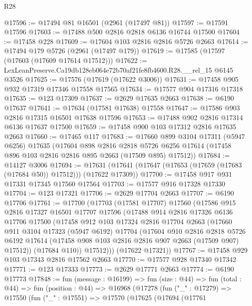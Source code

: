 \begin{lexlean}{R28}
\begin{coremodule}
@17596 := @17494 @81 @16501 (@2961 (@17497 @81))
@17597 := @17591 @17596
@17603 := @17488 @500 @2816 @2818 @6136 @16744 @17500
@17604 := @17458 @228
@17609 := @17604 @103 @2816 @2816 @5726 @2663
@17614 := @17494 @179 @5726 (@2961 (@17497 @179))
@17619 := @17585 (@17597 (@17603 (@17609 @17614 @17512)))
@17622 := LexLeanPreserve.Ca19db128eb064e72b70af21fe8fb4600.R28.__rel_15 @6145 @3526
@17625 := @17576 (@17619 (@17622 @3006))
@17631 := @17458 @905 @932 @17319 @17346 @17558 @17565
@17634 := @17577 @904 @17316 @17318
@17635 := @123 @17309
@17637 := @2629 @17635 @2663
@17638 := @6190 @17637
@17641 := @17634 (@17581 @17638) @17558
@17647 := @17586 @903 @2816 @17315 @16501 @17638 @17596
@17653 := @17488 @902 @2816 @17314 @6136 @17637 @17500
@17659 := @17458 @900 @103 @17312 @2816 @17635 @2663
@17660 := @17465 @117
@17683 := @17660
    @899
    @3104
    @17311
    (@5947 @6256)
    @17635
    (@17604
      @898
      @2816
      @2818
      @5726
      @6256
      @17614
      (@17458 @896 @103 @2816 @2816 @895 @2663 (@17509 @895) @17512))
@17684 := @14127 @3006
@17694 := @17631 (@17641 (@17647 (@17653 (@17659 (@17683 (@17684 @50)) @17512))) (@17622 @17309))
@17700 := @17458 @917 @931 @17331 @17345 @17560 @17564
@17703 := @17577 @916 @17328 @17330
@17704 := @123 @17321
@17706 := @2629 @17704 @2663
@17707 := @6190 @17706
@17761 := @17700
    (@17703
      (@17581 @17707)
      @17560
      (@17586
        @915
        @2816
        @17327
        @16501
        @17707
        @17596
        (@17488
          @914
          @2816
          @17326
          @6136
          @17706
          @17500
          (@17458
            @912
            @103
            @17324
            @2816
            @17704
            @2663
            (@17660
              @911
              @3104
              @17323
              (@5947 @6192)
              @17704
              (@17604
                @910
                @2816
                @2818
                @5726
                @6192
                @17614
                (@17458 @908 @103 @2816 @2816 @907 @2663 (@17509 @907) @17512))
              (@17684 @110))
            @17512)))
      (@17622 @17321))
@17767 := @17458 @929 @103 @17343 @2816 @17562 @2663
@17770 := @17577 @928 @17340 @17342
@17771 := @123 @17333
@17773 := @2629 @17771 @2663
@17774 := @6190 @17773
@17848 := fun (message : @16199) =>
  fun (size : @44) =>
  fun (total : @44) =>
  fun (position : @44) =>
  @16968
    (@17278
      (fun ("_" : @17279) =>
      @17550
        (fun ("_" : @17551) =>
        @17570
          (@17625
            (@17694
              (@17761

\end{coremodule}
\end{lexlean}
